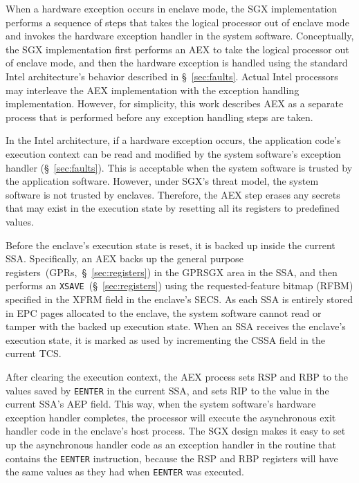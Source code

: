 When a hardware exception occurs in enclave mode, the SGX implementation
performs a sequence of steps that takes the logical processor out of enclave
mode and invokes the hardware exception handler in the system software.
Conceptually, the SGX implementation first performs an AEX to take the logical
processor out of enclave mode, and then the hardware exception is handled
using the standard Intel architecture's behavior described in
\S~\ref{sec:faults}. Actual Intel processors may interleave the AEX
implementation with the exception handling implementation. However, for
simplicity, this work describes AEX as a separate process that is performed
before any exception handling steps are taken.

In the Intel architecture, if a hardware exception occurs, the application
code's execution context can be read and modified by the system software's
exception handler (\S~\ref{sec:faults}). This is acceptable when the system
software is trusted by the application software. However, under SGX's threat
model, the system software is not trusted by enclaves. Therefore, the AEX step
erases any secrets that may exist in the execution state by resetting all its
registers to predefined values.


Before the enclave's execution state is reset, it is backed up inside the
current SSA. Specifically, an AEX backs up the general purpose
registers~(GPRs,~\S~\ref{sec:registers}) in the GPRSGX area in the SSA, and
then performs an \texttt{XSAVE}~(\S~\ref{sec:registers}) using the
requested-feature bitmap (RFBM) specified in the XFRM field in the enclave's
SECS. As each SSA is entirely stored in EPC pages allocated to the enclave, the
system software cannot read or tamper with the backed up execution state. When
an SSA receives the enclave's execution state, it is marked as used by
incrementing the CSSA field in the current TCS.


After clearing the execution context, the AEX process sets RSP and RBP to the
values saved by \texttt{EENTER} in the current SSA, and sets RIP to the value
in the current SSA's AEP field. This way, when the system software's hardware
exception handler completes, the processor will execute the asynchronous exit
handler code in the enclave's host process. The SGX design makes it easy to
set up the asynchronous handler code as an exception handler in the routine
that contains the \texttt{EENTER} instruction, because the RSP and RBP
registers will have the same values as they had when \texttt{EENTER} was
executed.

